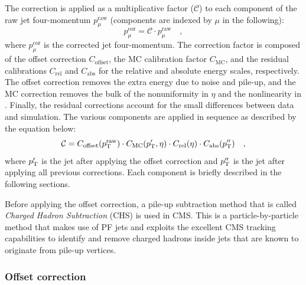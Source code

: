 The correction is applied as a multiplicative factor ($\mathcal{C}$) to each component of the raw jet four-momentum $p_\mu^\mathrm{raw}$ (components are indexed by $\mu$ in the following):
\begin{equation}
p_\mu^\mathrm{cor} = \mathcal{C}\cdot p_\mu^\mathrm{raw} \quad,
\end{equation}
where $p_\mu^\mathrm{cor}$ is the corrected jet four-momentum. The correction factor is composed of the offset correction $C_\mathrm{offset}$, the MC calibration factor $C_\mathrm{MC}$, and the residual calibrations $C_\mathrm{rel}$ and $C_\mathrm{abs}$ for the relative and absolute energy scales, respectively. The offset correction removes the extra energy due to noise and pile-up, and the MC correction removes the bulk of the nonuniformity in $\eta$ and the nonlinearity in \pt. Finally, the residual corrections account for the small differences between data and simulation. The various components are applied in sequence as described by the equation below:
\begin{equation}
\mathcal{C} = C_\mathrm{offset}(p_\mathrm{T}^\mathrm{raw}) \cdot C_\mathrm{MC}(p_\mathrm{T}',\eta) \cdot C_\mathrm{rel}(\eta) \cdot C_\mathrm{abs}(p_\mathrm{T}'') \quad ,
\end{equation}
where $p_\mathrm{T}'$ is the jet \pt after applying the offset correction and $p_\mathrm{T}''$ is the jet \pt after applying all previous corrections. Each component is briefly described in the following sections.

Before applying the offset correction, a pile-up subtraction method that is called \emph{Charged Hadron Subtraction} (CHS) is used in CMS. This is a particle-by-particle method that makes use of PF jets and exploits the excellent CMS tracking capabilities to identify and remove charged hadrons inside jets that are known to originate from pile-up vertices.

\subsubsection{Offset correction}
 
